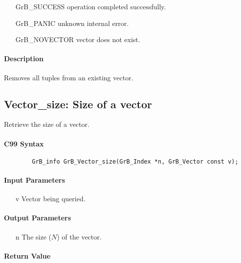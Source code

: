 \begin{itemize}[leftmargin=2.1in]
\item[{\sf GrB\_SUCCESS}]   operation completed successfully.
\item[{\sf GrB\_PANIC}]     unknown internal error.
\item[{\sf GrB\_NOVECTOR}]  vector does not exist.
\end{itemize}

\paragraph{Description}

Removes all tuples from an existing vector.

\subsection{{\sf Vector\_size}: Size of a vector}

Retrieve the size of a vector.

\paragraph{C99 Syntax}

\begin{verbatim}
        GrB_info GrB_Vector_size(GrB_Index *n, GrB_Vector const v);
\end{verbatim}

\paragraph{Input Parameters}

\begin{itemize}[leftmargin=1.1in]
    \item[{\sf v}] Vector being queried.
\end{itemize}

\paragraph{Output Parameters}
\begin{itemize}[leftmargin=1.1in]
    \item[{\sf n}] The size ($N$) of the vector.
\end{itemize}

\paragraph{Return Value}

